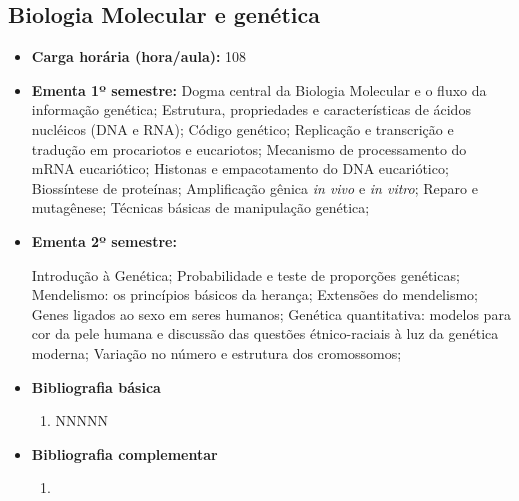 \documentclass[11pt,fleqn]{book} %
\begin{document}
\subsection{Biologia Molecular e genética}\label{disc:biomol}
\begin{itemize}
	\item \textbf{Carga horária (hora/aula):} 108
	\item \textbf{Ementa 1º semestre:}
	Dogma central da Biologia Molecular e o fluxo da informação genética;
	Estrutura, propriedades e características de ácidos nucléicos (DNA e RNA);
	Código genético; 
	Replicação e transcrição e tradução em procariotos e eucariotos;
	Mecanismo de processamento do mRNA eucariótico; 
	Histonas e empacotamento do DNA eucariótico; 
	Biossíntese de proteínas; 
	Amplificação gênica \textit{in vivo} e \textit{in vitro}; 
	Reparo e mutagênese;
	Técnicas básicas de manipulação genética;
	
	\item \textbf{Ementa 2º semestre:}	
	
	Introdução à Genética;
	Probabilidade e teste de proporções genéticas; 
	Mendelismo: os princípios básicos da herança; 
	Extensões do mendelismo; 
	Genes ligados ao sexo em seres humanos;
	Genética quantitativa: modelos para cor da pele humana e discussão das questões étnico-raciais à luz da genética moderna;
	Variação no número e estrutura dos cromossomos;
	
	\item \textbf{Bibliografia básica}
	\begin{enumerate}
		\item NNNNN
	\end{enumerate}
	\item \textbf{Bibliografia complementar}
	\begin{enumerate}
		\item 
	\end{enumerate}	
\end{itemize}

\newpage
\end{document}
